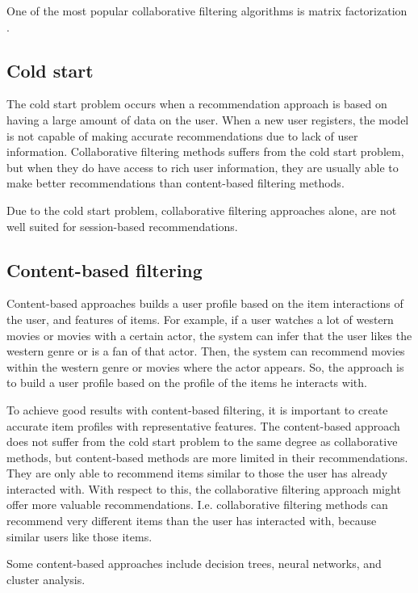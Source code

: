One of the most popular collaborative filtering algorithms is matrix factorization \cite{matrix-factorization}.

\subsection{Cold start}
The cold start problem occurs when a recommendation approach is based on having a large amount of data on the user. When a new user registers, the model is not capable of making accurate recommendations due to lack of user information. Collaborative filtering methods suffers from the cold start problem, but when they do have access to rich user information, they are usually able to make better recommendations than content-based filtering methods.

Due to the cold start problem, collaborative filtering approaches alone, are not well suited for session-based recommendations.

\subsection{Content-based filtering}
Content-based approaches builds a user profile based on the item interactions of the user, and features of items. For example, if a user watches a lot of western movies or movies with a certain actor, the system can infer that the user likes the western genre or is a fan of that actor. Then, the system can recommend movies within the western genre or movies where the actor appears. So, the approach is to build a user profile based on the profile of the items he interacts with.

To achieve good results with content-based filtering, it is important to create accurate item profiles with representative features. The content-based approach does not suffer from the cold start problem to the same degree as collaborative methods, but content-based methods are more limited in their recommendations. They are only able to recommend items similar to those the user has already interacted with. With respect to this, the collaborative filtering approach might offer more valuable recommendations. I.e. collaborative filtering methods can recommend very different items than the user has interacted with, because similar users like those items.

Some content-based approaches include decision trees, neural networks, and cluster analysis.


